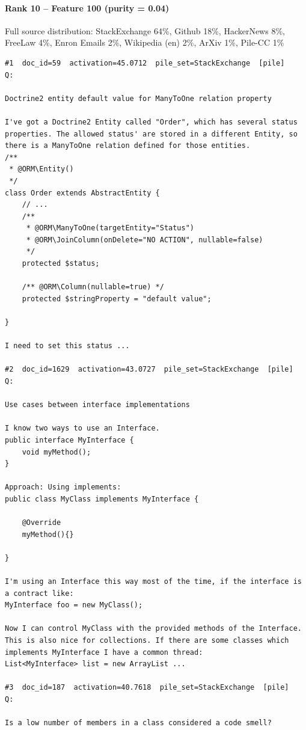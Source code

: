 \paragraph*{Rank 10 -- Feature 100 (purity = 0.04)}

Full source distribution: StackExchange 64\%, Github 18\%, HackerNews 8\%, FreeLaw 4\%, Enron Emails 2\%, Wikipedia (en) 2\%, ArXiv 1\%, Pile-CC 1\%

\begin{verbatim}
#1  doc_id=59  activation=45.0712  pile_set=StackExchange  [pile]
Q:

Doctrine2 entity default value for ManyToOne relation property

I've got a Doctrine2 Entity called "Order", which has several status properties. The allowed status' are stored in a different Entity, so there is a ManyToOne relation defined for those entities.
/**
 * @ORM\Entity()
 */
class Order extends AbstractEntity {
    // ...
    /**
     * @ORM\ManyToOne(targetEntity="Status")
     * @ORM\JoinColumn(onDelete="NO ACTION", nullable=false)
     */
    protected $status;

    /** @ORM\Column(nullable=true) */
    protected $stringProperty = "default value";

}

I need to set this status ...

#2  doc_id=1629  activation=43.0727  pile_set=StackExchange  [pile]
Q:

Use cases between interface implementations

I know two ways to use an Interface. 
public interface MyInterface {
    void myMethod();
}

Approach: Using implements:
public class MyClass implements MyInterface {

    @Override
    myMethod(){}

}

I'm using an Interface this way most of the time, if the interface is a contract like:
MyInterface foo = new MyClass();   

Now I can control MyClass with the provided methods of the Interface.
This is also nice for collections. If there are some classes which implements MyInterface I have a common thread:  
List<MyInterface> list = new ArrayList ...

#3  doc_id=187  activation=40.7618  pile_set=StackExchange  [pile]
Q:

Is a low number of members in a class considered a code smell?


\end{verbatim}
